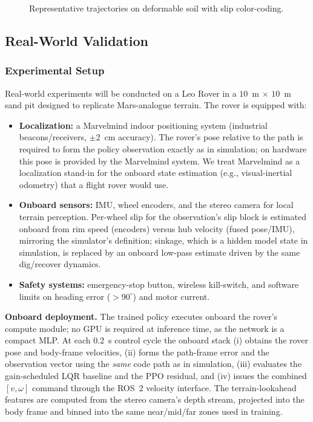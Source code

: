 \documentclass[conference]{IEEEtran}
\begin{document}
\begin{figure}[t]
\centering
{}
\caption{Representative trajectories on deformable soil with slip color-coding.}
\label{fig:trajectories}
\end{figure}

\subsection{Real-World Validation}
\label{sec:realworld}
\subsubsection{Experimental Setup}
Real-world experiments will be conducted on a Leo Rover in a $10$~m $\times$ $10$~m sand pit designed to replicate Mars-analogue terrain. The rover is equipped with:
\begin{itemize}
\item \textbf{Localization:} a Marvelmind indoor positioning system (industrial beacons/receivers, $\pm2$~cm accuracy). The rover's pose relative to the path is required to form the policy observation exactly as in simulation; on hardware this pose is provided by the Marvelmind system. We treat Marvelmind as a localization stand-in for the onboard state estimation (e.g., visual-inertial odometry) that a flight rover would use.
\item \textbf{Onboard sensors:} IMU, wheel encoders, and the stereo camera for local terrain perception. Per-wheel slip for the observation's slip block is estimated onboard from rim speed (encoders) versus hub velocity (fused pose/IMU), mirroring the simulator's definition; sinkage, which is a hidden model state in simulation, is replaced by an onboard low-pass estimate driven by the same dig/recover dynamics.
\item \textbf{Safety systems:} emergency-stop button, wireless kill-switch, and software limits on heading error ($>90^\circ$) and motor current.
\end{itemize}

\noindent\textbf{Onboard deployment.} The trained policy executes onboard the rover's compute module; no GPU is required at inference time, as the network is a compact MLP. At each $0.2$~s control cycle the onboard stack (i) obtains the rover pose and body-frame velocities, (ii) forms the path-frame error and the observation vector using the \emph{same} code path as in simulation, (iii) evaluates the gain-scheduled LQR baseline and the PPO residual, and (iv) issues the combined $[v,\omega]$ command through the ROS~2 velocity interface. The terrain-lookahead features are computed from the stereo camera's depth stream, projected into the body frame and binned into the same near/mid/far zones used in training.
\end{document}

